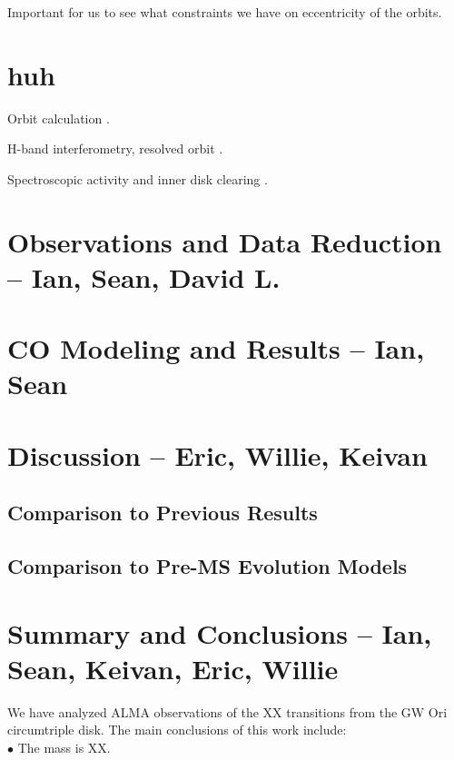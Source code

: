 \documentclass{aastex6}
\begin{document}
Important for us to see what constraints we have on eccentricity of the orbits.


\section{huh}


Orbit calculation \citep{mathieu91}.

H-band interferometry, resolved orbit \citep{berger11}.

Spectroscopic activity and inner disk clearing \citep{fang14}.


\section{Observations and Data Reduction -- {\bf Ian, Sean, David L.}}\label{sec:data}


\section{CO Modeling and Results -- {\bf Ian, Sean}} \label{sec:method}



\section{Discussion -- {\bf Eric, Willie, Keivan}}\label{sec:disc}



\subsection{Comparison to Previous Results}

\subsection{Comparison to Pre-MS Evolution Models}


\section{Summary and Conclusions -- {\bf Ian, Sean, Keivan, Eric, Willie}} \label{sec:summary}

We have analyzed ALMA observations of the XX transitions from the GW Ori circumtriple disk.  The main conclusions of this work include: \\

\noindent $\bullet$ The mass is XX.
\end{document}
